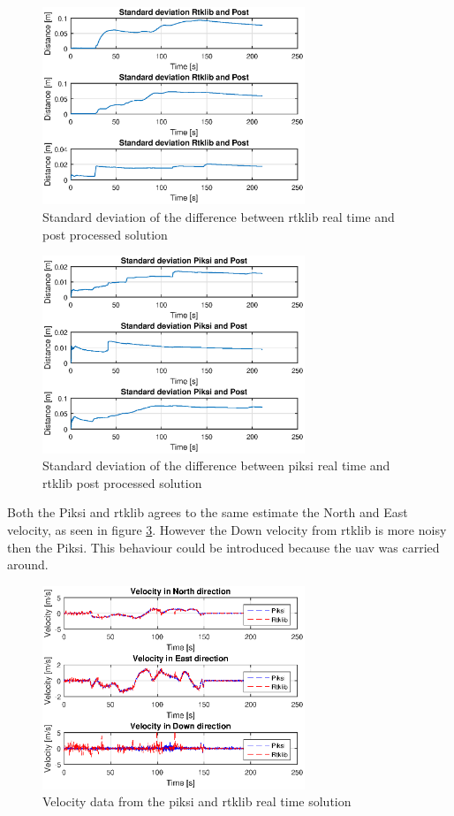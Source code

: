 \begin{figure}[H]
	\centering
		\includegraphics[width=0.7\textwidth]{figs/plots/stdrtkpost.eps}
		\caption{Standard deviation of the difference between rtklib real time and post processed solution}
		\label{figure:stdRTK}
\end{figure}
\begin{figure}[H]
	\centering
		\includegraphics[width=0.7\textwidth]{figs/plots/stdpiksipost.eps}
		\caption{Standard deviation of the difference between piksi real time and rtklib post processed solution}
		\label{figure:stdPiksi}
\end{figure}
Both the Piksi and \gls{rtklib} agrees to the same estimate the North and East velocity, as seen in figure \ref{figure:VelocityWalk1}. However the Down velocity from \gls{rtklib} is more noisy then the Piksi. This behaviour could be introduced because the \gls{uav} was carried around.
\begin{figure}[H]
	\centering
		\includegraphics[width=0.7\textwidth]{figs/plots/velocityWalk1.eps}
		\caption{Velocity data from the piksi and rtklib real time solution}
		\label{figure:VelocityWalk1}
\end{figure}
